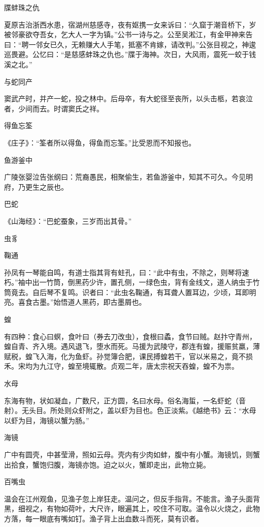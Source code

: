 \documentclass[a4paper,12pt,UTF8,twoside]{ctexbook}
\begin{document}
    牒蚌珠之仇
    
    夏原吉治浙西水患，宿湖州慈感寺，夜有妪携一女来诉曰：“久窟于潮音桥下，岁被邻豪欲夺吾女，乞大人一字为镇。”公书一诗与之。公至吴淞江，有金甲神来告曰：“聘一邻女已久，无赖赚大人手笔，抵塞不肯嫁，请改判。”公张目视之，神逡巡畏避。公忆曰：“是慈感蚌珠之仇也。”牒于海神。次日，大风雨，震死一蛟于钱溪之北。”
    
    与蛇同产
    
    窦武产时，并产一蛇，投之林中。后母卒，有大蛇径至丧所，以头击柩，若哀泣者，少间而去。时谓窦氏之祥。
    
    得鱼忘筌
    
    《庄子》：“筌者所以得鱼，得鱼而忘筌。”比受恩而不知报也。
    
    鱼游釜中
    
    广陵张婴泣告张纲曰：荒裔愚民，相聚偷生，若鱼游釜中，知其不可久。今见明府，乃更生之辰也。
    
    巴蛇
    
    《山海经》：“巴蛇蚕象，三岁而出其骨。”
    
    虫豸
    
    鞠通
    
    孙凤有一琴能自鸣，有道士指其背有蛀孔，曰：“此中有虫，不除之，则琴将速朽。”袖中出一竹筒，倒黑药少许，置孔侧，一绿色虫，背有金线文，道人纳虫于竹筒竟去。自后琴不复鸣。识者曰：“此虫名鞠通，有耳聋人置耳边，少顷，耳即明亮。喜食古墨。”始悟道人黑药，即古墨屑也。
    
    蝗
    
    有四种：食心曰螟，食叶曰（券去刀改虫），食根曰蟊，食节曰贼。赵抃守青州，蝗自青、齐入境。遇风退飞，堕水而死。马援为武陵守，郡连有蝗，援赈贫羸，薄赋税，蝗飞入海，化为鱼虾。孙觉簿合肥，课民搏蝗若干，官以米易之，竟不损禾。宋均为九江守，蝗至境辄散。贞观二年，唐太宗祝天吞蝗，蝗不为祟。
    
    水母
    
    东海有物，状如凝血，广数尺，正方圆，名曰水母。俗名海蜇，一名虾蛇（音射）。无头目。所处则众虾附之，盖以虾为目也。色正淡紫。《越绝书》云：“水母以虾为目，海镜以蟹为肠。”
    
    海镜
    
    广中有圆壳，中甚莹滑，照如云母。壳内有少肉如蚌，腹中有小蟹。海镜饥，则蟹出拾食，蟹饱归腹，海镜亦饱。迫之以火，蟹即走出，此物立毙。
    
    百嘴虫
    
    温会在江州观鱼，见渔子忽上岸狂走。温问之，但反手指背。不能言。渔子头面背黑，细视之，有物如荷叶，大尺许，眼遍其上，咬住不可取。温令以火烧之，此物方落，每一眼底有嘴如钉。渔子背上出血数斗而死，莫有识者。
    
\end{document}
